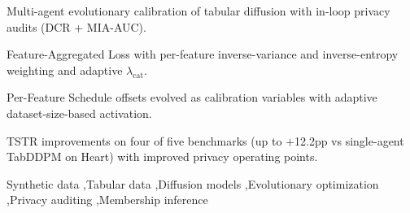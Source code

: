 \documentclass[preprint,12pt]{elsarticle}
\begin{document}
\begin{frontmatter}
\begin{abstract}
Across five real-world tabular benchmarks, MADiff-T improves TSTR utility over the original single-agent TabDDPM baseline on four of five datasets, although some gains are modest relative to seed variance, while shifting the utility--privacy operating point through privacy-in-the-loop selection. We further introduce two training enhancements: (i) a \textbf{Feature-Aggregated (FA) Loss} that re-weights continuous and categorical loss terms by per-feature inverse variance and inverse entropy, preventing high-variance features from monopolizing gradient signal, and (ii) \textbf{Per-Feature Schedule (PFS) offsets} that extend the evolutionary search to per-feature noise schedule perturbations, with adaptive activation based on dataset size and feature-type composition. Together these enhancements improve TSTR by up to $+$12.2 percentage
points over the single-agent TabDDPM baseline on Heart, with more modest gains on other datasets. Importantly, MADiff-T uses multi-agent refinement only during training; deployment uses a single selected model. All privacy results are \emph{audit-based} under stated protocols and do not constitute a formal differential privacy guarantee.
\end{abstract}

\begin{highlights}
\item Multi-agent evolutionary calibration of tabular diffusion with in-loop privacy audits (DCR + MIA-AUC).
\item Feature-Aggregated Loss with per-feature inverse-variance and inverse-entropy weighting and adaptive $\lambda_{\text{cat}}$.
\item Per-Feature Schedule offsets evolved as calibration variables with adaptive dataset-size-based activation.
\item TSTR improvements on four of five benchmarks (up to $+$12.2pp
vs single-agent TabDDPM on Heart) with improved privacy operating points.
\end{highlights}

\begin{keyword}
Synthetic data \sep Tabular data \sep Diffusion models \sep Evolutionary optimization \sep Privacy auditing \sep Membership inference
\end{keyword}

\end{frontmatter}
\end{document}
